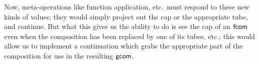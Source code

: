 \documentclass{article}
\begin{document}
Now, meta-operations like function application, etc.\ must respond to these new
kinds of values; they would simply project out the cap or the appropriate tube,
and continue. But what this gives us the ability to do is see the cap of an
$\mathsf{fcom}$ even when the composition has been replaced by one of its
tubes, etc.; this would allow us to implement a continuation which grabs the
appropriate part of the composition for use in the resulting $\mathsf{gcom}$.
\end{document}
